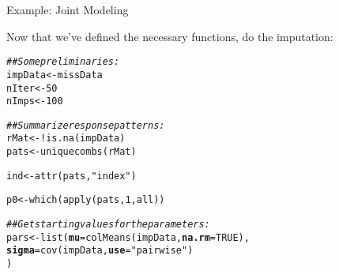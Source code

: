 \documentclass[10pt]{beamer}\usepackage[]{graphicx}\usepackage[]{color}
\makeatletter
\newcommand{\hlnum}[1]{\textcolor[rgb]{0.69,0.494,0}{#1}}%
\newcommand{\hlstr}[1]{\textcolor[rgb]{0.749,0.012,0.012}{#1}}%
\newcommand{\hlcom}[1]{\textcolor[rgb]{0.514,0.506,0.514}{\textit{#1}}}%
\newcommand{\hlopt}[1]{\textcolor[rgb]{0,0,0}{#1}}%
\newcommand{\hlstd}[1]{\textcolor[rgb]{0,0,0}{#1}}%
\newcommand{\hlkwb}[1]{\textcolor[rgb]{0,0.341,0.682}{#1}}%
\newcommand{\hlkwc}[1]{\textcolor[rgb]{0,0,0}{\textbf{#1}}}%
\newcommand{\hlkwd}[1]{\textcolor[rgb]{0.004,0.004,0.506}{#1}}%
\newenvironment{kframe}{%
 \def\at@end@of@kframe{}%
 \ifinner\ifhmode%
  \def\at@end@of@kframe{\end{minipage}}%
  \begin{minipage}{\columnwidth}%
 \fi\fi%
 \def\FrameCommand##1{\hskip\@totalleftmargin \hskip-\fboxsep
 \colorbox{shadecolor}{##1}\hskip-\fboxsep
     \hskip-\linewidth \hskip-\@totalleftmargin \hskip\columnwidth}%
 \MakeFramed {\advance\hsize-\width
   \@totalleftmargin\z@ \linewidth\hsize
   \@setminipage}}%
 {\par\unskip\endMakeFramed%
 \at@end@of@kframe}
\newenvironment{knitrout}{}{} %
\makeatother
\begin{document}
\begin{frame}[fragile]{Example: Joint Modeling}

  Now that we've defined the necessary functions, do the imputation:
  
\begin{knitrout}\footnotesize
{}\color{fgcolor}\begin{kframe}
\begin{alltt}
\hlcom{## Some preliminaries:}
\hlstd{impData} \hlkwb{<-} \hlstd{missData}
\hlstd{nIter}   \hlkwb{<-} \hlnum{50}
\hlstd{nImps}   \hlkwb{<-} \hlnum{100}

\hlcom{## Summarize response patterns:}
\hlstd{rMat} \hlkwb{<-} \hlopt{!}\hlkwd{is.na}\hlstd{(impData)}
\hlstd{pats} \hlkwb{<-} \hlkwd{uniquecombs}\hlstd{(rMat)}
\end{alltt}


{\ttfamily\noindent\bfseries{}}\begin{alltt}
\hlstd{ind}  \hlkwb{<-} \hlkwd{attr}\hlstd{(pats,} \hlstr{"index"}\hlstd{)}
\end{alltt}


{\ttfamily\noindent\bfseries\color{errorcolor}{Error in eval(expr, envir, enclos): object 'pats' not found}}\begin{alltt}
\hlstd{p0}   \hlkwb{<-} \hlkwd{which}\hlstd{(}\hlkwd{apply}\hlstd{(pats,} \hlnum{1}\hlstd{, all))}
\end{alltt}


{\ttfamily\noindent\bfseries\color{errorcolor}{Error in apply(pats, 1, all): object 'pats' not found}}\begin{alltt}
\hlcom{## Get starting values for the parameters:}
\hlstd{pars} \hlkwb{<-} \hlkwd{list}\hlstd{(}\hlkwc{mu}    \hlstd{=} \hlkwd{colMeans}\hlstd{(impData,} \hlkwc{na.rm} \hlstd{=} \hlnum{TRUE}\hlstd{),}
             \hlkwc{sigma} \hlstd{=} \hlkwd{cov}\hlstd{(impData,} \hlkwc{use} \hlstd{=} \hlstr{"pairwise"}\hlstd{)}
             \hlstd{)}
\end{alltt}
\end{kframe}
\end{knitrout}

\end{frame}

\end{document}
